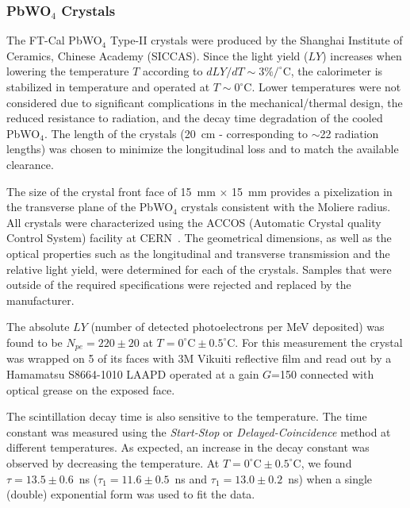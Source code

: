 \subsubsection{PbWO$_4$ Crystals}

The FT-Cal PbWO$_4$ Type-II crystals were produced by the Shanghai Institute of Ceramics, Chinese Academy
(SICCAS). Since the light yield ($LY$) increases when lowering the temperature $T$ according to 
$dLY/dT \sim 3\%/^\circ$C, the calorimeter is stabilized in temperature and operated at
$T \sim 0^\circ$C. Lower temperatures were not considered due to significant complications in the
mechanical/thermal design, the reduced resistance to radiation,  and the decay time degradation of the cooled
PbWO$_4$. The length of the crystals (20~cm - corresponding to $\sim$22 radiation lengths) was chosen to
minimize the longitudinal loss and to match the available clearance.

The size of the crystal front face of 15~mm $\times$ 15~mm provides a pixelization in the transverse plane of
the PbWO$_4$ crystals consistent with the Moliere radius. All crystals were characterized using the ACCOS
(Automatic Crystal quality Control System) facility at CERN~\cite{accos}. The geometrical dimensions, as well as the
optical properties such as the longitudinal and transverse transmission and the relative light yield, were determined
for each of the crystals. Samples that were outside of the required specifications were rejected and replaced by the
manufacturer. 

The absolute $LY$ (number of detected photoelectrons per MeV deposited) was found to be $N_{pe}=220\pm 20$
at $T=0^\circ\textrm{C}\pm 0.5^\circ\textrm{C}$. For this measurement the crystal was wrapped on 5 of its faces
with 3M Vikuiti reflective film and read out by a Hamamatsu S8664-1010 LAAPD operated at a gain $G$=150
connected with optical grease on the exposed face. 

The scintillation decay time is also sensitive to the temperature. The time constant was measured using the
{\it Start-Stop} or {\it Delayed-Coincidence} method at different temperatures. As expected, an increase in the
decay constant was observed by decreasing the temperature. At $T=0^\circ\textrm{C}\pm 0.5^\circ\textrm{C}$, we
found $\tau=13.5\pm 0.6$~ns ($\tau_1=11.6\pm 0.5$~ns and $\tau_1=13.0\pm 0.2$~ns) when a single (double)
exponential form was used to fit the data.

